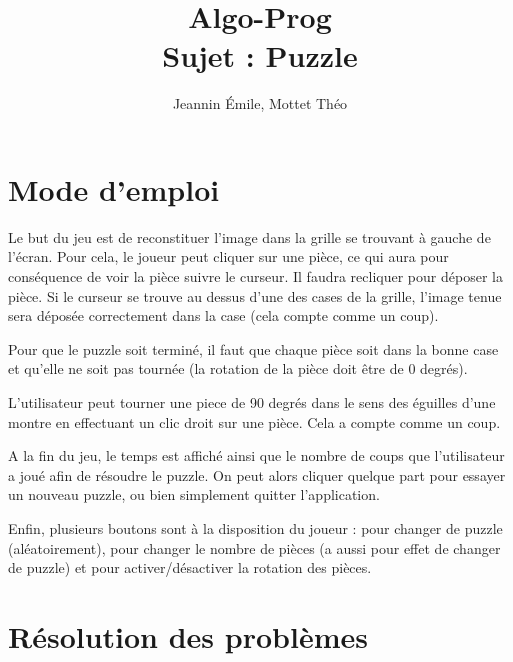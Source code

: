 \documentclass[]{article}
\title{Algo-Prog\\Sujet \no2 : Puzzle}
\author{Jeannin Émile, Mottet Théo}
\begin{document}
\maketitle
\newpage
\tableofcontents
\newpage
\section{Mode d'emploi}

Le but du jeu est de reconstituer l'image dans la grille se trouvant à gauche de l'écran. Pour cela, le joueur peut cliquer sur une pièce, ce qui aura pour conséquence de voir la pièce suivre le curseur. Il faudra recliquer pour déposer la pièce. Si le curseur se trouve au dessus d'une des cases de la grille, l'image tenue sera déposée correctement dans la case (cela compte comme un coup).

Pour que le puzzle soit terminé, il faut que chaque pièce soit dans la bonne case et qu'elle ne soit pas tournée (la rotation de la pièce doit être de 0 degrés).

L'utilisateur peut tourner une piece de 90 degrés dans le sens des éguilles d'une montre en effectuant un clic droit sur une pièce. Cela a compte comme un coup.

A la fin du jeu, le temps est affiché ainsi que le nombre de coups que l'utilisateur a joué afin de résoudre le puzzle. On peut alors cliquer quelque part pour essayer un nouveau puzzle, ou bien simplement quitter l'application.

Enfin, plusieurs boutons sont à la disposition du joueur : pour changer de puzzle (aléatoirement), pour changer le nombre de pièces (a aussi pour effet de changer de puzzle) et pour activer/désactiver la rotation des pièces.

\section{Résolution des problèmes}
\end{document}
